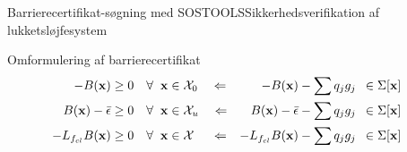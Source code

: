 \begin{frame}{Barrierecertifikat-søgning med SOSTOOLS}{Sikkerhedsverifikation af lukketsløjfesystem}
\vspace{2mm}
\begin{block}{Omformulering af barrierecertifikat}
	\vspace{-5mm}
	\begin{align*}
	&&	-B(\mathbf{x}) &\geq 0 \quad  \forall \hspace{2mm} \mathbf{x} \in \mathcal{X}_0 \quad \Leftarrow& 	-B(\mathbf{x}) - \sum q_jg_j &\,\,\,\in \Sigma[\mathbf{x}] &&& \\
	&&	B(\mathbf{x})-\bar{\epsilon} &\geq 0 \quad  \forall \hspace{2mm} \mathbf{x} \in \mathcal{X}_u \quad \Leftarrow& 	B(\mathbf{x})-\bar{\epsilon} - \sum q_jg_j &\,\,\,\in \Sigma[\mathbf{x}] &&& \\
	&&	-L_{f_{cl}}B(\mathbf{x}) &\geq 0 \quad  \forall \hspace{2mm} \mathbf{x} \in \mathcal{X} \quad\,\, \Leftarrow& 	-L_{f_{cl}}B(\mathbf{x}) - \sum q_jg_j &\,\,\,\in \Sigma[\mathbf{x}] &&& 
	\end{align*}
\end{block}
\end{frame}

